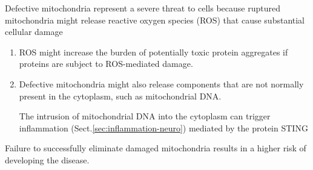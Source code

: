 Defective mitochondria represent a severe threat to cells because ruptured
mitochondria might release reactive oxygen species (ROS) that cause substantial
cellular damage
\begin{enumerate}

  \item  ROS might increase the burden of potentially toxic protein aggregates
  if proteins are subject to ROS-mediated damage.

  \item Defective mitochondria might also release components that are not normally present in the cytoplasm, such as mitochondrial DNA.
  
  The intrusion of mitochondrial DNA into the cytoplasm can trigger inflammation (Sect.\ref{sec:inflammation-neuro}) mediated by the protein STING
\end{enumerate}

Failure to successfully eliminate damaged mitochondria results in a higher risk
of developing the disease.

